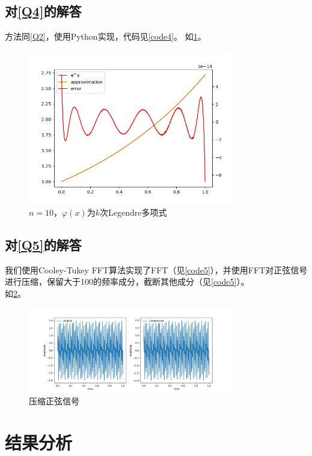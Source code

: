\documentclass[a4paper,11pt,notitlepage]{article}
\begin{document}
\subsection{对\ref{Q4}的解答}
方法同\ref{Q2}，使用Python实现，代码见\cref{code4}。
如\cref{pic:4}。
\begin{figure}[H]
    \centering
    \includegraphics[width=0.8\textwidth]{../picture/Seventh_Week_1D.png}
    \caption{$n=10$，$\varphi(x)$为$k$次Legendre多项式}
    \label{pic:4}
\end{figure}

\subsection{对\ref{Q5}的解答}
我们使用Cooley-Tukey FFT算法实现了FFT（见\cref{code5}），并使用FFT对正弦信号进行压缩，保留大于100的频率成分，截断其他成分（见\cref{code5}）。\\
如\cref{pic:5}。
\begin{figure}[H]
    \centering
    \includegraphics[width=0.8\textwidth]{../picture/Seventh_Week_2.png}
    \caption{压缩正弦信号}
    \label{pic:5}
\end{figure}

\section{结果分析}
\end{document}
